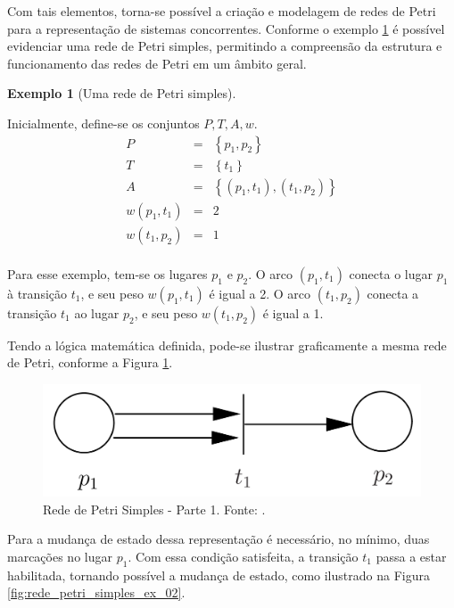 \documentclass[
	12pt,				%
	openright,			%
	oneside,			%
	a4paper,			%
	english,			%
	brazil				%
	]{abntex2}
\theoremstyle{doispontos}
\newtheorem{exemplo}{Exemplo}
\begin{document}
Com tais elementos, torna-se possível a criação e modelagem de redes de Petri para a representação de sistemas concorrentes. Conforme o exemplo \ref{exemplo_rede_petri_simples} é possível evidenciar uma rede de Petri simples, permitindo a compreensão da estrutura e funcionamento das redes de Petri em um âmbito geral.

\begin{exemplo}[Uma rede de Petri simples] \label{exemplo_rede_petri_simples} 
\end{exemplo}
Inicialmente, define-se os conjuntos $P, T, A, w$. 
\begin{eqnarray*}
P &=& \left \{ p_{1},p_{2}\right \} \\
T &=& \left \{ t_{1}\right \} \\
A &=& \left \{ \left (p_{1},t_{1}\right ),\left (t_{1},p_{2}\right ) \right \} \\
w\left ( p_{1},t_{1} \right ) &=& 2 \\
w\left ( t_{1},p_{2} \right ) &=& 1 \\
\end{eqnarray*}


Para esse exemplo, tem-se os lugares $p_{1}$ e $p_{2}$. O arco $\left ( p_{1},t_{1} \right )$ conecta o lugar $p_{1}$ à transição $t_{1}$, e seu peso $w\left ( p_{1},t_{1} \right )$ é igual a 2. O arco $\left ( t_{1},p_{2} \right )$ conecta a transição  $t_{1}$ ao lugar $p_{2}$, e seu peso $w\left ( t_{1},p_{2} \right )$ é igual a 1. 

Tendo a lógica matemática definida, pode-se ilustrar graficamente a mesma rede de Petri, conforme a Figura \ref{fig:rede_petri_simples_ex_01}.

\begin{figure}[ht] 
	\centering
	\includegraphics[scale=0.3]{exemplo_simples_rede_petri.png}
	\caption[Rede de Petri Simples - Parte 1]{Rede de Petri Simples - Parte 1. Fonte: \textcite{CassandrasLafortune08}.}
	\label{fig:rede_petri_simples_ex_01}
\end{figure} 

Para a mudança de estado dessa representação é necessário, no mínimo, duas marcações no lugar $p_{1}$. Com essa condição satisfeita, a transição $t_{1}$ passa a estar habilitada, tornando possível a mudança de estado, como ilustrado na Figura \ref{fig:rede_petri_simples_ex_02}.
\end{document}
